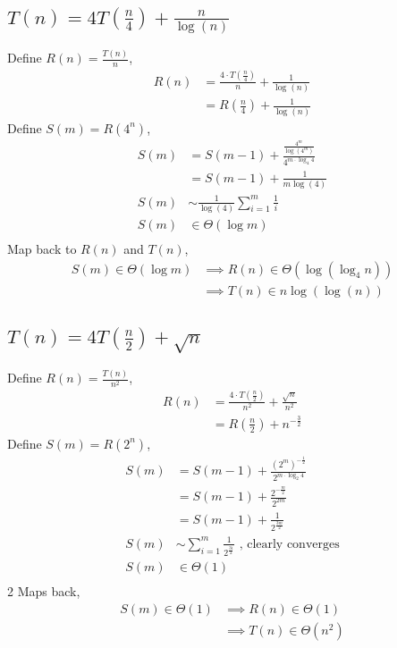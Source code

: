 \documentclass{article}
\begin{document}
\subsection*{$T(n) = 4T(\frac{n}{4}) + \frac{n}{\log(n)}$}
Define $R(n) = \frac{T(n)}{n}$,
\begin{align*}
    R(n) &= \frac{4\cdot T(\frac{n}{4})}{n} + \frac{1}{\log(n)}\\
    &= R(\frac{n}{4}) + \frac{1}{\log(n)}
\end{align*}
Define $S(m) = R(4^n)$,
\begin{align*}
    S(m) & = S(m - 1) + \frac{\frac{4^m}{\log(4^m)}}{4^{m\cdot \log_4 4}}\\
    &= S(m - 1) + \frac{1}{m \log(4)}\\
    S(m) &\sim \frac{1}{\log(4)}\sum_{i=1}^{m} \frac{1}{i}\\
    S(m) &\in \Theta(\log m)\\
\end{align*}
Map back to $R(n)$ and $T(n)$, 
\begin{align*}
    S(m) \in \Theta(\log m) &\implies R(n) \in \Theta(\log(\log_4 n))\\
    &\implies T(n) \in n\log(\log(n))
\end{align*}


\subsection*{$T(n) = 4T(\frac{n}{2}) + \sqrt{n}$}
Define $R(n) = \frac{T(n)}{n^2}$,
\begin{align*}
    R(n) &= \frac{4\cdot T(\frac{n}{2})}{n^2} + \frac{\sqrt{n}}{n^2}\\
    &= R(\frac{n}{2}) + {n^{-\frac{3}{2}}}
\end{align*}
Define $S(m) = R(2^n)$,
\begin{align*}
    S(m) & = S(m - 1) + \frac{(2^m)^{-\frac{1}{2}}}{2^{m \cdot \log_2 4}}\\
    &= S(m - 1) + \frac{2^{-\frac{m}{2}}}{2^{2m}}\\
    &= S(m - 1) + \frac{1}{2^{\frac{3m}{2}}}\\
    S(m) &\sim \sum_{i=1}^{m} \frac{1}{2^{\frac{3i}{2}}} \text{ , clearly converges}\\
    S(m) &\in \Theta(1)\\
\end{align*}2
Maps back, 
\begin{align*}
    S(m) \in \Theta(1) &\implies R(n) \in \Theta(1)\\
    &\implies T(n) \in \Theta(n^2)
\end{align*}
\end{document}

